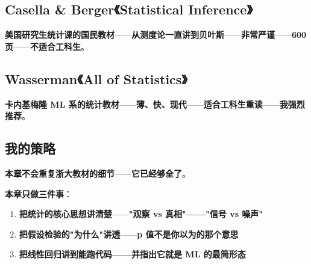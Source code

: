 \subsection{Casella \& Berger《Statistical Inference》}

\textbf{美国研究生统计课的国民教材}——\textbf{从测度论一直讲到贝叶斯}——\textbf{非常严谨}——\textbf{600 页}——\textbf{不适合工科生}。

\subsection{Wasserman《All of Statistics》}

\textbf{卡内基梅隆 ML 系的统计教材}——\textbf{薄、快、现代}——\textbf{适合工科生重读}——\textbf{我强烈推荐}。

\subsection{我的策略}

\textbf{本章不会重复浙大教材的细节}——\textbf{它已经够全了}。

\textbf{本章只做三件事}：

\begin{enumerate}
\item \textbf{把统计的核心思想讲清楚}——\textbf{"观察 vs 真相"——"信号 vs 噪声"}
\item \textbf{把假设检验的"为什么"讲透}——\textbf{p 值不是你以为的那个意思}
\item \textbf{把线性回归讲到能跑代码——并指出它就是 ML 的最简形态}
\end{enumerate}

